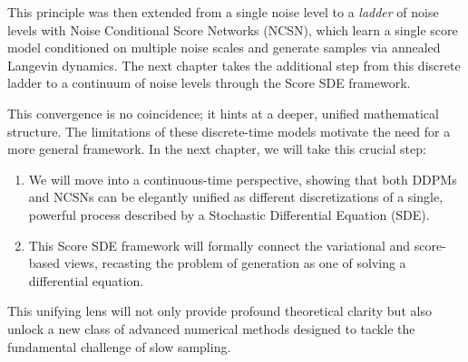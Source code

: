 This principle was then extended from a single noise level to a \emph{ladder}
of noise levels with Noise Conditional Score Networks (NCSN), which learn a
single score model conditioned on multiple noise scales and generate samples
via annealed Langevin dynamics. The next chapter takes the additional step from
this discrete ladder to a continuum of noise levels through the Score SDE
framework.




This convergence is no coincidence; it hints at a deeper, unified mathematical structure. The limitations of these discrete-time models motivate the need for a more general framework. In the next chapter, we will take this crucial step:
\begin{enumerate}
    \item We will move into a continuous-time perspective, showing that both DDPMs and NCSNs can be elegantly unified as different discretizations of a single, powerful process described by a Stochastic Differential Equation (SDE).
    \item This Score SDE framework will formally connect the variational and score-based views, recasting the problem of generation as one of solving a differential equation.
\end{enumerate}

This unifying lens will not only provide profound theoretical clarity but also unlock a new class of advanced numerical methods designed to tackle the fundamental challenge of slow sampling. 